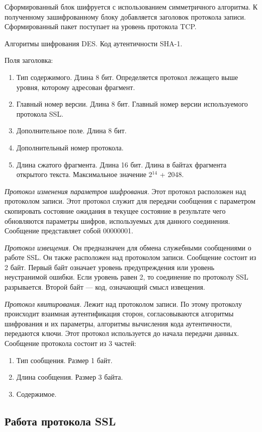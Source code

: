 \documentclass[12pt, russian, oneside, article]{ncc}
\begin{document}
Сформированный блок шифруется с использованием симметричного алгоритма. К полученному зашифрованному блоку добавляется заголовок протокола записи.
Сформированный пакет поступает на уровень протокола TCP.

Алгоритмы шифрования DES. Код аутентичности SHA-1.

Поля заголовка:
\begin{enumerate}
\item Тип содержимого. Длина 8 бит. Определяется протокол лежащего выше уровня, которому адресован фрагмент.
\item Главный номер версии. Длина 8 бит. Главный номер версии используемого протокола SSL.
\item Дополнительное поле. Длина 8 бит.
\item Дополнительный номер протокола.
\item Длина сжатого фрагмента. Длина 16 бит. Длина в байтах фрагмента открытого текста. Максимальное значение 2$^{\mathrm{14}}$ + 2048.
\end{enumerate}

\emph{Протокол изменения параметров шифрования}. Этот протокол расположен над протоколом записи. Этот протокол служит для передачи сообщения с параметром скопировать состояние ожидания в текущее состояние в результате чего обновляются параметры шифров, используемых для данного соединения. Сообщение представляет собой 00000001.

\emph{Протокол извещения}. Он предназначен для обмена служебными сообщениями о работе SSL. Он также расположен над протоколом записи. Сообщение состоит из 2 байт. Первый байт означает уровень предупреждения или уровень неустранимой ошибки. Если уровень равен 2, то соединение по протоколу SSL разрывается. Второй байт --- код, означающий смысл извещения.

\emph{Протокол квитирования}. Лежит над протоколом записи. По этому протоколу происходит взаимная аутентификация сторон, согласовываются алгоритмы шифрования и их параметры, алгоритмы вычисления кода аутентичности, передаются ключи. Этот протокол используется до начала передачи данных. Сообщение протокола состоит из 3 частей:
\begin{enumerate}
\item Тип сообщения. Размер 1 байт.
\item Длина сообщения. Размер 3 байта.
\item Содержимое.
\end{enumerate}
\subsection{Работа протокола SSL}
\label{sec-7_1}
\end{document}
